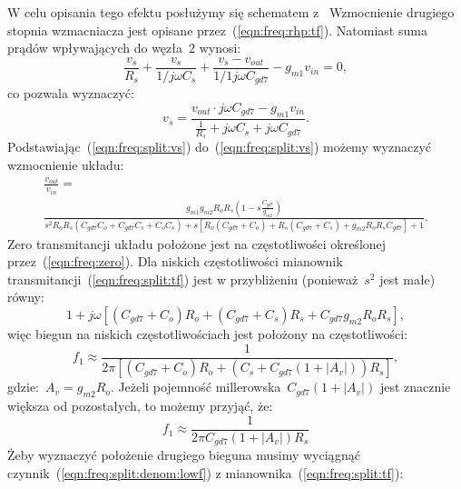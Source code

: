 \documentclass[twoside,pl,final]{labman}
\begin{document}
W celu opisania tego efektu posłużymy się
schematem z~
Wzmocnienie drugiego stopnia wzmacniacza jest opisane
przez~(\ref{eqn:freq:rhp:tf}).
Natomiast suma prądów wpływających do węzła~$2$ wynosi:
\begin{equation}
  \frac{v_s}{R_s} +
  \frac{v_s}{1 / j \omega C_s} +
  \frac{v_s - v_{out}}{1 / 1 j \omega C_{gd7}} -
  g_{m1} v_{in} = 0,
  \label{eqn:freq:split:kirchoff}
\end{equation}
co pozwala wyznaczyć:
\begin{equation}
  v_s = \frac{v_{out} \cdot j \omega C_{gd7} - g_{m1} v_{in}}
        {\frac{1}{R_s} + j \omega C_s + j \omega C_{gd7}}.
  \label{eqn:freq:split:vs}
\end{equation}
Podstawiając~(\ref{eqn:freq:split:vs}) do~(\ref{eqn:freq:split:vs})
możemy wyznaczyć wzmocnienie układu:
\begin{align}
  \frac{v_{out}}{v_{in}} = \nonumber \\
  \frac{g_{m1} g_{m2} R_o R_s (1 - s \frac{C_{gd7}}{g_{m2}})}
    {s^2 R_o R_s (C_{gd7} C_o + C_{gd7} C_s + C_o C_s) +
    s[R_o (C_{gd7} + C_o) + R_s (C_{gd7} + C_s) + g_{m2} R_o R_s C_{gd7}] + 1}.
  \label{eqn:freq:split:tf}
\end{align}
Zero transmitancji układu położone jest na
częstotliwości określonej przez~(\ref{eqn:freq:zero}).
Dla niskich częstotliwości mianownik
transmitancji~(\ref{eqn:freq:split:tf})
jest w przybliżeniu (ponieważ~$s^2$ jest małe) równy:
\begin{equation}
  1 + j \omega [(C_{gd7} + C_o) R_o +
                (C_{gd7} + C_s) R_s +
                C_{gd7} g_{m2} R_o R_s],
  \label{eqn:freq:split:denom:lowf}
\end{equation}
więc biegun na niskich częstotliwościach jest położony na częstotliwości:
\begin{equation}
  f_1 \approx \frac{1}{2 \pi [(C_{gd7} + C_o) R_o +
                              (C_s + C_{gd7} (1 + |A_v|)) R_s]},
  \label{eqn:freq:split:pole:low}
\end{equation}
gdzie:~$A_v = g_{m2} R_o$.
Jeżeli pojemność millerowska~$C_{gd7} (1 + |A_v|)$ jest
znacznie większa od pozostałych, to możemy przyjąć, że:
\begin{equation}
  f_1 \approx \frac{1}{2 \pi C_{gd7} (1 + |A_v|) R_s}
  \label{eqn:freq:split:pole:low:approx}
\end{equation}
Żeby wyznaczyć położenie drugiego bieguna musimy
wyciągnąć czynnik~(\ref{eqn:freq:split:denom:lowf})
z mianownika~(\ref{eqn:freq:split:tf}):
\end{document}
